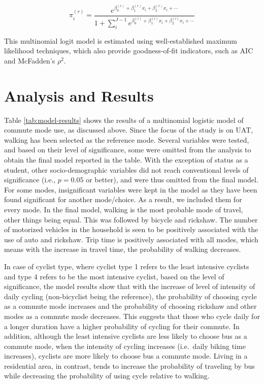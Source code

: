 \documentclass[]{elsarticle} %
\begin{document}
\begin{equation}
\label{model-probability-r}
\pi^{(r)}_i = \frac{e^{\beta^{(r)}_0 + \beta^{(r)}_1x_i + \beta^{(r)}_2x_i + \cdots}}{1+\sum_i^{J-1}e^{\beta^{(i)}_0 + \beta^{(i)}_1x_i + \beta^{(i)}_2x_i + \cdots}}
\end{equation}

This multinomial logit model is estimated using well-established maximum
likelihood techniques, which also provide goodness-of-fit indicators,
such as AIC and McFadden's \(\rho^2\).

\hypertarget{analysis-and-results}{%
\section{Analysis and Results}\label{analysis-and-results}}

Table \ref{tab:model-results} shows the results of a multinomial
logistic model of commute mode use, as discussed above. Since the focus
of the study is on UAT, walking has been selected as the reference mode.
Several variables were tested, and based on their level of significance,
some were omitted from the analysis to obtain the final model reported
in the table. With the exception of status as a student, other
socio-demographic variables did not reach conventional levels of
significance (i.e., \(p = 0.05\) or better), and were thus omitted from
the final model. For some modes, insignificant variables were kept in
the model as they have been found significant for another mode/choice.
As a result, we included them for every mode. In the final model,
walking is the most probable mode of travel, other things being equal.
This was followed by bicycle and rickshaw. The number of motorized
vehicles in the household is seen to be positively associated with the
use of auto and rickshaw. Trip time is positively associated with all
modes, which means with the increase in travel time, the probability of
walking decreases.

In case of cyclist type, where cyclist type 1 refers to the least
intensive cyclists and type 4 refers to be the most intensive cyclist,
based on the level of significance, the model results show that with the
increase of level of intensity of daily cycling (non-bicyclist being the
reference), the probability of choosing cycle as a commute mode
increases and the probability of choosing rickshaw and other modes as a
commute mode decreases. This suggests that those who cycle daily for a
longer duration have a higher probability of cycling for their commute.
In addition, although the least intensive cyclists are less likely to
choose bus as a commute mode, when the intensity of cycling increases
(i.e.~daily biking time increases), cyclists are more likely to choose
bus a commute mode. Living in a residential area, in contrast, tends to
increase the probability of traveling by bus while decreasing the
probability of using cycle relative to walking.
\end{document}
